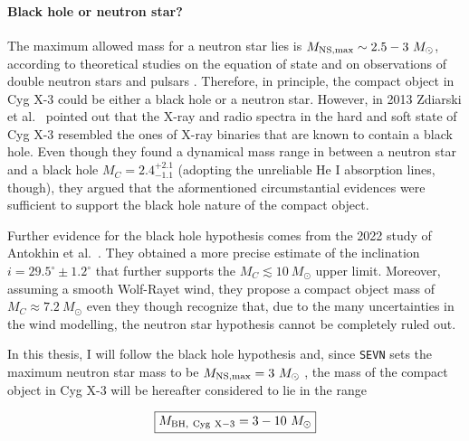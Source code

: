 \documentclass[a4paper,titlepage]{book}     	%
\newcommand{\sun}{\ensuremath{_\odot}}
\newcommand{\msun}{\ensuremath{M\sun}}
\begin{document}
\paragraph{Black hole or neutron star?}
The maximum allowed mass for a neutron star lies is $M_{\rm NS,max}\sim 2.5-3~\msun$, according to theoretical studies on the equation of state and on observations of double neutron stars and pulsars \cite{NSreview}. Therefore, in principle, the compact object in Cyg X-3 could be either a black hole or a neutron star. However, in 2013 Zdiarski et al.\ \cite{Cyg-X3_Zd2013} pointed out that the X-ray and radio spectra in the hard and soft state of Cyg X-3 resembled the ones of X-ray binaries that are known to contain a black hole. Even though they found a dynamical mass range in between a neutron star and a black hole $M_C = 2.4_{-1.1}^{+2.1}$ (adopting the unreliable He I absorption lines, though), they argued that the aformentioned circumstantial evidences were sufficient to support the black hole nature of the compact object. 

Further evidence for the black hole hypothesis comes from the 2022 study of Antokhin et al.\ \cite{CygX-3_Antokhin2022}. They obtained a more precise estimate of the inclination $i = 29.5^{\circ} \pm 1.2^{\circ}$ that further supports the $M_C \lesssim 10~\msun$ upper limit. Moreover, assuming a smooth Wolf-Rayet wind, they propose a compact object mass of $M_C \approx 7.2~\msun $ even they though recognize that, due to the many uncertainties in the wind modelling, the neutron star hypothesis cannot be completely ruled out.

In this thesis, I will follow the black hole hypothesis and, since \texttt{SEVN} sets the maximum neutron star mass to be  $M_{\rm NS,max} = 3~\msun$ \cite{spera2019_mergingBBH}, the mass of the compact object in Cyg X-3 will be hereafter considered to lie in the range

\begin{equation}\label{eq:MBHCygX3}
    \boxed{M_{\rm BH,~Cyg~X-3} = 3-10~\msun}
\end{equation}
\end{document}
